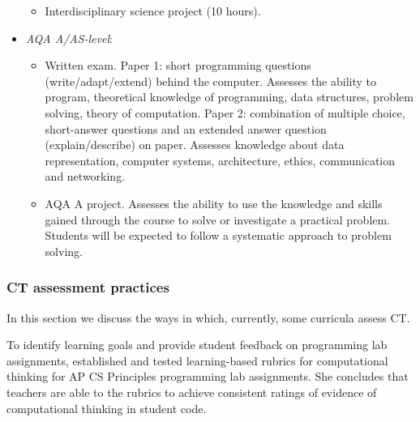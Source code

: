 \begin{itemize}
\begin{itemize}
    \item Interdisciplinary science project (10 hours).
    \end{itemize}



\item \emph{AQA A/AS-level}:
    \begin{itemize}
    \item Written exam. Paper 1: short programming questions (write/adapt/extend) behind the computer. Assesses the ability to program, theoretical knowledge of programming, data structures, problem solving, theory of computation. Paper 2: combination of multiple choice, short-answer questions and an extended answer question (explain/describe) on paper. Assesses knowledge about data representation, computer systems, architecture, ethics, communication and networking.
    \item AQA A project. Assesses the ability to use the knowledge and skills gained through the course to solve or investigate a practical problem. Students will be expected to follow a systematic approach to problem solving.

    \end{itemize}

\end{itemize}




\subsubsection{CT assessment practices}

In this section we discuss the ways in which, currently, some curricula assess CT.

To identify learning goals and provide student feedback on programming lab assignments,  established and tested learning-based rubrics for computational thinking for AP CS Principles programming lab assignments. She concludes that teachers are able to the rubrics to achieve consistent ratings of evidence of computational thinking in student code.

